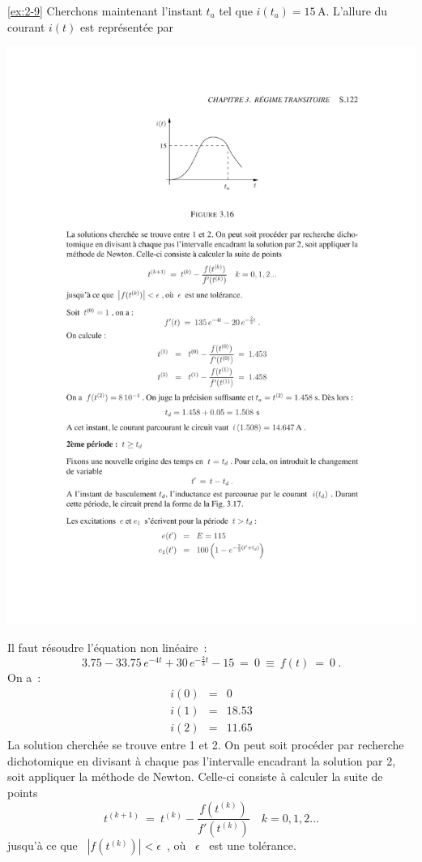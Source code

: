 \begin{solexercise}{\ref{ex:2-9}}
Cherchons maintenant l'instant $t_a$ tel que $i(t_a) =
15\,$A. L'allure du courant $i(t)$ est repr\'esent\'ee par
\begin{center}
	\includegraphics[width=\linewidth]{sol_exercices/ex3-9-2}
\end{center}
Il faut r\'esoudre l'\'equation non lin\'eaire~:
\[ 3.75 - 33.75 \, e^{-4t} + 30 \, e^{-\frac{2}{3}t} - 15 \: = \: 0 \: \equiv \ f(t) \: = \: 0~. \]
On a~:
\begin{eqnarray*}
	i(0) &=&0\\
	i(1) &=& 18.53\\
	i(2) &=& 11.65
\end{eqnarray*}
La solution cherch\'ee se trouve entre 1 et 2.  On peut soit proc\'eder
par recherche dichotomique en divisant \`a chaque pas l'intervalle
encadrant la solution par 2, soit appliquer la m\'ethode de
Newton. Celle-ci consiste \`a calculer la suite de points
\[ t^{(k+1)} \: = \: t^{(k)} - \frac{f(t^{(k)})}{f'(t^{(k)})} \quad k = 0,1,2... \]
jusqu'\`a ce que \ $\left| f(t^{(k)})\right| < \epsilon$~, o\`u \ $\epsilon$ \ est une tol\'erance.


\end{solexercise}
